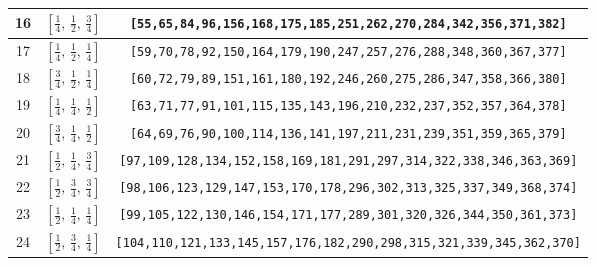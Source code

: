 \documentclass[fleqn,8pt]{jsarticle}
\begin{document}
\begin{longtable}{ccc}
16 & $\left[ \frac{1}{4},\, \frac{1}{2},\, \frac{3}{4} \right]$ & {\tt [55,65,84,96,156,168,175,185,251,262,270,284,342,356,371,382]} \\ \hline
17 & $\left[ \frac{1}{4},\, \frac{1}{2},\, \frac{1}{4} \right]$ & {\tt [59,70,78,92,150,164,179,190,247,257,276,288,348,360,367,377]} \\ \hline
18 & $\left[ \frac{3}{4},\, \frac{1}{2},\, \frac{1}{4} \right]$ & {\tt [60,72,79,89,151,161,180,192,246,260,275,286,347,358,366,380]} \\ \hline
19 & $\left[ \frac{1}{4},\, \frac{1}{4},\, \frac{1}{2} \right]$ & {\tt [63,71,77,91,101,115,135,143,196,210,232,237,352,357,364,378]} \\ \hline
20 & $\left[ \frac{3}{4},\, \frac{1}{4},\, \frac{1}{2} \right]$ & {\tt [64,69,76,90,100,114,136,141,197,211,231,239,351,359,365,379]} \\ \hline
21 & $\left[ \frac{1}{2},\, \frac{1}{4},\, \frac{3}{4} \right]$ & {\tt [97,109,128,134,152,158,169,181,291,297,314,322,338,346,363,369]} \\ \hline
22 & $\left[ \frac{1}{2},\, \frac{3}{4},\, \frac{3}{4} \right]$ & {\tt [98,106,123,129,147,153,170,178,296,302,313,325,337,349,368,374]} \\ \hline
23 & $\left[ \frac{1}{2},\, \frac{1}{4},\, \frac{1}{4} \right]$ & {\tt [99,105,122,130,146,154,171,177,289,301,320,326,344,350,361,373]} \\ \hline
24 & $\left[ \frac{1}{2},\, \frac{3}{4},\, \frac{1}{4} \right]$ & {\tt [104,110,121,133,145,157,176,182,290,298,315,321,339,345,362,370]} \\
\end{longtable}
\renewcommand{\arraystretch}{1.2}
\end{document}
